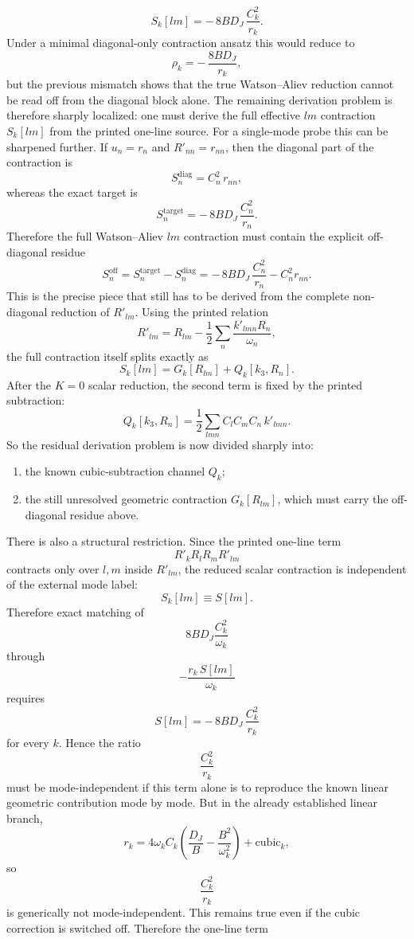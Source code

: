 \documentclass[aip,jcp,reprint,floatfix]{revtex4-2}
\begin{document}
\[
S_k[lm]
=
-\,8BD_J\,\frac{C_k^2}{r_k}.
\]
Under a minimal diagonal-only contraction ansatz this would reduce to
\[
\rho_k=-\,\frac{8BD_J}{r_k},
\]
but the previous mismatch shows that the true Watson--Aliev reduction cannot be
read off from the diagonal block alone. The remaining derivation problem is
therefore sharply localized: one must derive the full effective \(lm\)
contraction \(S_k[lm]\) from the printed one-line source.
For a single-mode probe this can be sharpened further. If \(u_n=r_n\) and
\(R'_{nn}=r_{nn}\), then the diagonal part of the contraction is
\[
S_n^{\mathrm{diag}}=C_n^2\,r_{nn},
\]
whereas the exact target is
\[
S_n^{\mathrm{target}}=-\,8BD_J\,\frac{C_n^2}{r_n}.
\]
Therefore the full Watson--Aliev \(lm\) contraction must contain the explicit
off-diagonal residue
\[
S_n^{\mathrm{off}}
=
S_n^{\mathrm{target}}-S_n^{\mathrm{diag}}
=
-\,8BD_J\,\frac{C_n^2}{r_n}-C_n^2r_{nn}.
\]
This is the precise piece that still has to be derived from the complete
non-diagonal reduction of \(R'_{lm}\).
Using the printed relation
\[
R'_{lm}=R_{lm}-\frac12\sum_n \frac{k'_{lmn}R_n}{\omega_n},
\]
the full contraction itself splits exactly as
\[
S_k[lm]=G_k[R_{lm}]+Q_k[k_3,R_n].
\]
After the \(K=0\) scalar reduction, the second term is fixed by the printed
subtraction:
\[
Q_k[k_3,R_n]
=
\frac12\sum_{lmn} C_lC_mC_n\,k'_{lmn}.
\]
So the residual derivation problem is now divided sharply into:
\begin{enumerate}
\item the known cubic-subtraction channel \(Q_k\);
\item the still unresolved geometric contraction \(G_k[R_{lm}]\), which must
carry the off-diagonal residue above.
\end{enumerate}
There is also a structural restriction. Since the printed one-line term
\[
R'_kR_lR_mR'_{lm}
\]
contracts only over \(l,m\) inside \(R'_{lm}\), the reduced scalar
contraction is independent of the external mode label:
\[
S_k[lm]\equiv S[lm].
\]
Therefore exact matching of
\[
8BD_J\frac{C_k^2}{\omega_k}
\]
through
\[
-\frac{r_k\,S[lm]}{\omega_k}
\]
requires
\[
S[lm]=-\,8BD_J\,\frac{C_k^2}{r_k}
\]
for every \(k\). Hence the ratio
\[
\frac{C_k^2}{r_k}
\]
must be mode-independent if this term alone is to reproduce the known linear
geometric contribution mode by mode.
But in the already established linear branch,
\[
r_k=4\omega_k C_k\!\left(\frac{D_J}{B}-\frac{B^2}{\omega_k^2}\right)+\text{cubic}_k,
\]
so
\[
\frac{C_k^2}{r_k}
\]
is generically not mode-independent. This remains true even if the cubic
correction is switched off. Therefore the one-line term
\end{document}
